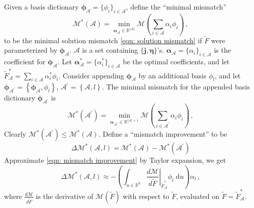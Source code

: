 Given a basis dictionary $\boldsymbol{\phi}_\mathcal{A} = 
\{\phi_i\}_{i\in \mathcal{A}}$, define the ``minimal mismatch''
\begin{equation}
    \mathcal{M}^*(\mathcal{A}) = \min_{\boldsymbol{\alpha}_\mathcal{A} \in \mathbb{R}^{|\mathcal{A}|}}
    \mathcal{M}\left( \sum_{i\in \mathcal{A}}
    {\alpha}_i {\phi}_i \right)\,,
\end{equation}
to be the minimal solution mismatch \eqref{eqn: solution mismatch} if $\tilde{F}$ were parameterized
by $\boldsymbol{\phi}_\mathcal{A}$. $\mathcal{A}$ is a set containing $\{\boldsymbol{j},
\boldsymbol{\eta}\}$'s.
$\boldsymbol{\alpha}_{\mathcal{A}} = \{\alpha_i\}_{i\in \mathcal{A}}$ is the coefficient for 
$\boldsymbol{\phi}_\mathcal{A}$. 
Let $\boldsymbol{\alpha}_{\mathcal{A}}^* =\{\alpha_i^*\}_{i\in \mathcal{A}}$
be the optimal coefficients, and let
$\tilde{F}^*_\mathcal{A} = \sum_{i\in \mathcal{A}} \alpha^*_i \phi_i$.
Consider appending $\boldsymbol{\phi}_{\mathcal{A}}$ 
by an additional basis
$\phi_l$, and let $\boldsymbol{\phi}_{\mathcal{A}^\prime} = \left\{
\boldsymbol{\phi}_{\mathcal{A}}, \phi_l \right\}$,
$\mathcal{A}^\prime = \left\{ \mathcal{A}, l \right\}$.
The minimal mismatch for the appended basis dictionary
$\boldsymbol{\phi}_{\mathcal{A}^\prime}$ is
\begin{equation}
    \mathcal{M}^*(\mathcal{A}^\prime) 
    = \min_{\boldsymbol{\alpha}_{\mathcal{A}^\prime} \in \mathbb{R}^{|\mathcal{A}|+1}}
    \mathcal{M}\left( \sum_{i\in \mathcal{A}^\prime}
    {\alpha}_{i} {\phi}_{i} \right)\,,
\end{equation}
Clearly $\mathcal{M}^*(\mathcal{A}^\prime) \le \mathcal{M}^*(\mathcal{A})$.
Define a ``mismatch improvement'' to be
\begin{equation}
    \Delta \mathcal{M}^*\left(\mathcal{A}, l\right) = \mathcal{M}^*(\mathcal{A}) - 
    \mathcal{M}^*(\mathcal{A}^\prime)
    \label{eqn: mismatch improvement}
\end{equation} 
Approximate \eqref{eqn: mismatch improvement} by Taylor expansion, we get
\begin{equation}
    \Delta\mathcal{M}^*\left(\mathcal{A}, l\right) 
    \approx -\left(\int_{u\in \mathbb{R}^k} \left.\frac{d\mathcal{M}}{d \tilde{F}}
    \right|_{\tilde{F}_\mathcal{A}^*} \phi_l
    \; \textrm{d} u \right) \alpha_l \,,
    \label{eqn: taylor expansion}
\end{equation}
where $\frac{d\mathcal{M}}{d\tilde{F}}$ is the derivative of $\mathcal{M}(\tilde{F})$ 
with respect to $\tilde{F}$, evaluated on $\tilde{F} = \tilde{F}^*_\mathcal{A}$.
